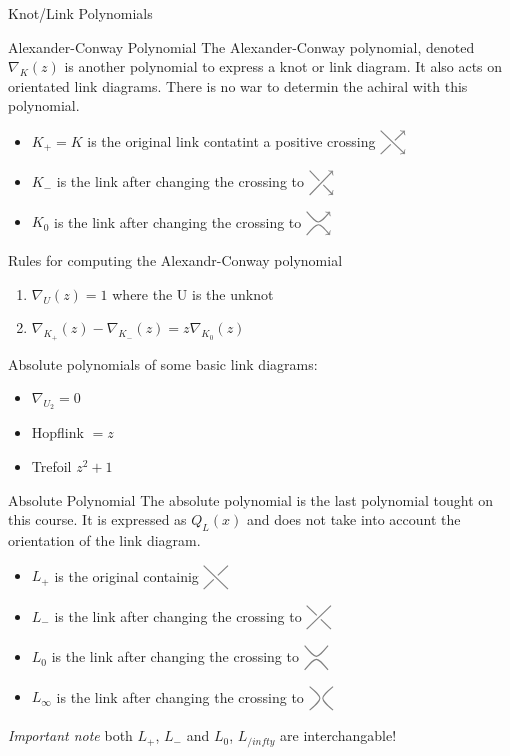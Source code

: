 \documentclass[12pt, letterpaper]{article}
\newcommand{\KP}[1]{%
  \begin{tikzpicture}[baseline=-\dimexpr\fontdimen22\textfont2\relax]
  #1
  \end{tikzpicture}%
}
\newcommand{\UCross}{%
  \KP{
    \draw[color=gray,thick] (-0.3,0.3) -- (0.3,-0.3);
    \draw[color=gray,thick] (-0.3,-0.3) -- (-0.05,-0.05);
    \draw[color=gray,thick] (0.05,0.05) -- (0.3,0.3);
  }%
}
\newcommand{\UOCross}{%
  \KP{
    \draw[color=gray,thick] (-0.3,0.3) -- (-0.05,0.05);
    \draw[color=gray,thick] (0.05,-0.05) -- (0.3,-0.3);
    \draw[color=gray,thick] (-0.3,-0.3) -- (0.3,0.3);
  }%
}
\newcommand{\DPCross}{%
  \KP{
    \draw[color=gray,thick,->] (-0.3,0.3) -- (0.3,-0.3);
    \draw[color=gray,thick] (-0.3,-0.3) -- (-0.05,-0.05);
    \draw[color=gray,thick,->] (0.05,0.05) -- (0.3,0.3);
  }%
}
\newcommand{\DNCross}{%
  \KP{
    \draw[color=gray,thick] (-0.3,0.3) -- (-0.05,0.05);
    \draw[color=gray,thick,->] (0.05,-0.05) -- (0.3,-0.3);
    \draw[color=gray,thick,->] (-0.3,-0.3) -- (0.3,0.3);
  }%
}
\newcommand{\RSmooth}{%
  \KP{%
    \draw[color=gray,thick] (-0.3,0.3)..controls (0,-0.05).. (0.3,0.3);
    \draw[color=gray,thick] (-0.3,-0.3)..controls (0,0.05).. (0.3,-0.3);
  }%
}
\newcommand{\LSmooth}{%
  \KP{%
    \draw[color=gray,thick] (-0.3,-0.3)..controls (0.05,0).. (-0.3,0.3);
    \draw[color=gray,thick] (0.3,-0.3)..controls (-0.05,0).. (0.3,0.3);
  }%
}
\newcommand{\DSmooth}{%
  \KP{%
    \draw[color=gray,thick,->] (-0.3,0.3)..controls (0,-0.05).. (0.3,0.3);
    \draw[color=gray,thick,->] (-0.3,-0.3)..controls (0,0.05).. (0.3,-0.3);
  }%
}
\begin{document}
\begin{section}{Knot/Link Polynomials}
\begin{subsection}{Alexander-Conway Polynomial}
The Alexander-Conway polynomial, denoted \(\nabla_{K}(z)\)
is another polynomial to express a knot or link diagram. It also acts on orientated link diagrams.
There is no war to determin the achiral with this polynomial.

\begin{itemize}
  \item \(K_{+} = K\) is the original link contatint a positive crossing \(\DPCross\)
  \item \(K_{-}\) is the link after changing the crossing to \(\DNCross\)
  \item \(K_{0}\) is the link after changing the crossing to \(\DSmooth\)
\end{itemize}

Rules for computing the Alexandr-Conway polynomial
\begin{enumerate}
  \item \(\nabla_{U}(z) = 1\) where the U is the unknot
  \item \(\nabla_{K_{+}}(z) - \nabla_{K_{-}}(z) = z\nabla_{K_{0}}(z)\)
\end{enumerate}

Absolute polynomials of some basic link diagrams:
\begin{itemize}
  \item \(\nabla_{U_{2}} = 0\)
  \item Hopflink \(= z\)
  \item Trefoil \(z^{2} + 1\)
\end{itemize}
\end{subsection}

\begin{subsection}{Absolute Polynomial}
The absolute polynomial is the last polynomial tought on this course.
It is expressed as \(Q_{L}(x)\) and does not take into account the orientation of the link diagram.

\begin{itemize}
  \item \(L_{+}\) is the original containig \(\UCross\)
  \item \(L_{-}\) is the link after changing the crossing to \(\UOCross\)
  \item \(L_{0}\) is the link after changing the crossing to \(\RSmooth\)
  \item \(L_{\infty}\) is the link after changing the crossing to \(\LSmooth\)
\end{itemize}
\emph{Important note} both \(L_{+}\), \(L_{-}\) and  \(L_{0}\), \(L_{/infty}\) are interchangable!


\end{subsection}
\end{section}
\end{document}
